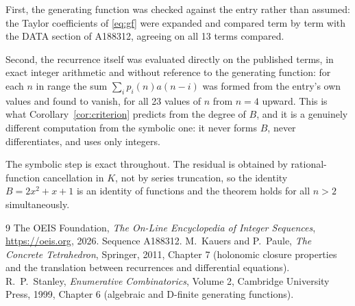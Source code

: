 \documentclass[11pt,a4paper]{article}
\theoremstyle{plain}
\theoremstyle{definition}
\begin{document}
First, the generating function was checked against the entry rather than assumed: the
Taylor coefficients of \eqref{eq:gf} were expanded and compared term by term with the DATA
section of A188312, agreeing on all 13 terms compared.

Second, the recurrence itself was evaluated directly on the published terms, in exact
integer arithmetic and without reference to the generating function: for each $n$ in range
the sum $\sum_{i}p_{i}(n)a(n-i)$ was formed from the entry's own values and found to
vanish, for all 23 values of $n$ from $n=4$ upward. This is what
Corollary~\ref{cor:criterion} predicts from the degree of $B$, and it is a genuinely
different computation from the symbolic one: it never forms $B$, never differentiates, and
uses only integers.

The symbolic step is exact throughout. The residual is obtained by rational-function
cancellation in $K$, not by series truncation, so the identity $B=2 x^{2} + x + 1$ is an
identity of functions and the theorem holds for all $n>2$ simultaneously.

\begin{thebibliography}{9}
 The OEIS Foundation, \emph{The On-Line Encyclopedia of Integer Sequences},
\url{https://oeis.org}, 2026. Sequence A188312.
 M.~Kauers and P.~Paule, \emph{The Concrete Tetrahedron}, Springer, 2011,
Chapter 7 (holonomic closure properties and the translation between recurrences and
differential equations).
 R.~P.~Stanley, \emph{Enumerative Combinatorics}, Volume 2, Cambridge
University Press, 1999, Chapter 6 (algebraic and D-finite generating functions).
\end{thebibliography}
\end{document}
